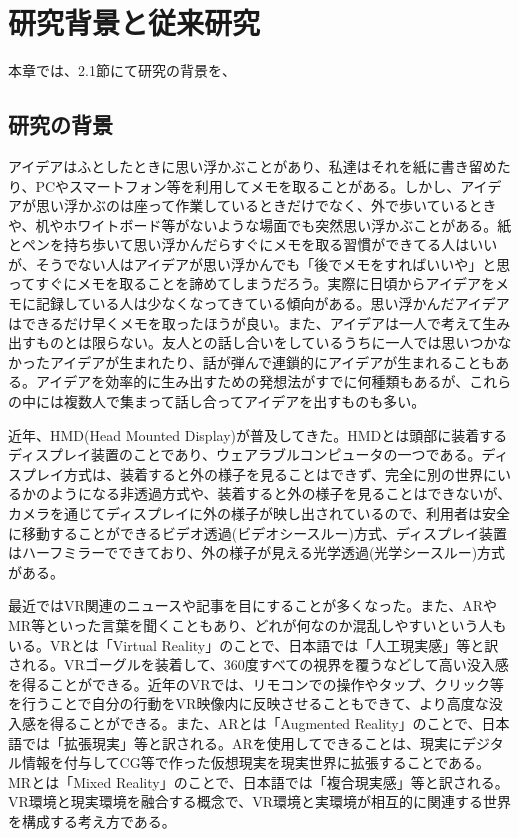 \documentclass[11pt,a4j, titlepage]{jarticle} %
\begin{document}
\newpage
\section{研究背景と従来研究}
本章では、2.1節にて研究の背景を、

\subsection{研究の背景}
アイデアはふとしたときに思い浮かぶことがあり、私達はそれを紙に書き留めたり、PCやスマートフォン等を利用してメモを取ることがある。しかし、アイデアが思い浮かぶのは座って作業しているときだけでなく、外で歩いているときや、机やホワイトボード等がないような場面でも突然思い浮かぶことがある。紙とペンを持ち歩いて思い浮かんだらすぐにメモを取る習慣ができてる人はいいが、そうでない人はアイデアが思い浮かんでも「後でメモをすればいいや」と思ってすぐにメモを取ることを諦めてしまうだろう。実際に日頃からアイデアをメモに記録している人は少なくなってきている傾向がある\cite{memo}。思い浮かんだアイデアはできるだけ早くメモを取ったほうが良い。また、アイデアは一人で考えて生み出すものとは限らない。友人との話し合いをしているうちに一人では思いつかなかったアイデアが生まれたり、話が弾んで連鎖的にアイデアが生まれることもある。アイデアを効率的に生み出すための発想法がすでに何種類もあるが、これらの中には複数人で集まって話し合ってアイデアを出すものも多い\cite{hassouhou}。

近年、HMD(Head Mounted Display)が普及してきた。HMDとは頭部に装着するディスプレイ装置のことであり、ウェアラブルコンピュータの一つである。ディスプレイ方式は、装着すると外の様子を見ることはできず、完全に別の世界にいるかのようになる非透過方式や、装着すると外の様子を見ることはできないが、カメラを通じてディスプレイに外の様子が映し出されているので、利用者は安全に移動することができるビデオ透過(ビデオシースルー)方式、ディスプレイ装置はハーフミラーでできており、外の様子が見える光学透過(光学シースルー)方式がある。

最近ではVR関連のニュースや記事を目にすることが多くなった。また、ARやMR等といった言葉を聞くこともあり、どれが何なのか混乱しやすいという人もいる。VRとは「Virtual Reality」のことで、日本語では「人工現実感」等と訳される。VRゴーグルを装着して、360度すべての視界を覆うなどして高い没入感を得ることができる。近年のVRでは、リモコンでの操作やタップ、クリック等を行うことで自分の行動をVR映像内に反映させることもできて、より高度な没入感を得ることができる。また、ARとは「Augmented Reality」のことで、日本語では「拡張現実」等と訳される。ARを使用してできることは、現実にデジタル情報を付与してCG等で作った仮想現実を現実世界に拡張することである。MRとは「Mixed Reality」のことで、日本語では「複合現実感」等と訳される。VR環境と現実環境を融合する概念で、VR環境と実環境が相互的に関連する世界を構成する考え方である。
\end{document}
